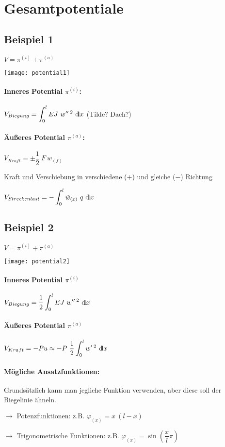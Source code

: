 
\section{Gesamtpotentiale}
\subsection{Beispiel 1}

	$ V = \pi^{(i)} + \pi^{(a)} $
	
	\texttt{[image: potential1]}
	
	
\paragraph{ Inneres Potential $ \pi^{(i)} $:}
	\qquad $ V_{Biegung} = \displaystyle\int_{0}^{l} E J\ w''\,^2 \ {\operatorname{d\!l}} x $  (Tilde? Dach?)
	
\paragraph{ Äußeres Potential $ \pi^{(a)} $:}
	\qquad $ V_{Kraft} = \pm \dfrac{1}{2}\ F\ w_{(f)} $
	
	Kraft und Verschiebung in verschiedene ($ + $) und gleiche ($ - $) Richtung
	
	$ V_{Streckenlast} = -\displaystyle\int_{0}^{l} \tilde{w}_{(x)}\ q\ {\operatorname{d\!l}} x $
	
\subsection{Beispiel 2}

	$ V = \pi^{(i)} + \pi^{(a)} $
	
	\texttt{[image: potential2]}
	
\paragraph{ Inneres Potential $ \pi^{(i)} $}
	\qquad $ V_{Biegung}= \dfrac{1}{2} \displaystyle \int_{0}^{l} E J\ w''\, ^2 \ {\operatorname{d\!l}} x $
	
\paragraph{ Äußeres Potential $ \pi^{(a)} $}
	\qquad $ V_{Kraft}  = - P u\approx - P\ \dfrac{1}{2}\ds \int_{0}^{l} w'\, ^2 \ \dd x $
	
\paragraph{	Mögliche Ansatzfunktionen:} \quad 

	Grundsätzlich kann man jegliche Funktion verwenden, aber diese soll der Biegelinie ähneln.
	
	$\rightarrow$ Potenzfunktionen: z.B. $ \varphi_{(x)}=x\ (l-x) $

	$\rightarrow$ Trigonometrische Funktionen: z.B. $ \varphi_{(x)}=\sin{\left(\dfrac{x}{l}\pi\right)} $
	
